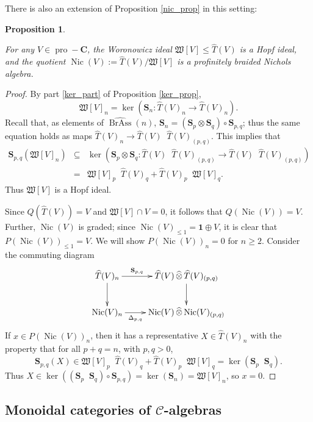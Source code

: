 \documentclass[12pt]{article}
\DeclareMathOperator{\Nic}{Nic}
\DeclareMathOperator{\pro}{pro}
\DeclareMathOperator{\BrAss}{BrAss}
\DeclareMathOperator{\hattimes}{\widehat{\otimes}}
\newcommand{\BrAsshat}{\widehat{\BrAss}} %
\newcommand{\That}{\widehat{T}}
\newcommand{\CC} {\mathcal{C}}
\newcommand{\bC} {\mathbf{C}}
\newcommand{\one} {\mathbf{1}}
\newcommand{\proC}{\pro\!-\bC}
\newcommand{\bS} {\mathbf{S}}
\newcommand{\mW}{\mathfrak{W}}
\theoremstyle{plain}
\newtheorem{prop}[thm]{Proposition}
\theoremstyle{definition}
\theoremstyle{remark}
\begin{document}
There is also an extension of Proposition \ref{nic_prop} in this setting:

\begin{prop} \label{infinite_nic_prop}

For any $V \in \proC$, the Woronowicz ideal $\mW[V] \leq \That(V)$ is a Hopf ideal, and the quotient $\Nic(V):= \That(V) / \mW[V]$ is a profinitely braided Nichols algebra.

\end{prop}

\begin{proof}

By part \ref{ker_part} of Proposition \ref{ker_prop}, 
%
$$\mW[V]_n = \ker(\bS_n: \That(V)_n \to \That(V)_n).$$
%
Recall that, as elements of $\BrAsshat(n)$, $\bS_n = (\bS_p \otimes \bS_q) \circ \bS_{p, q}$; thus the same equation holds as maps $\That(V)_n \to \That(V) \hattimes \That(V)_{(p, q)}$.  This implies that 
%
\begin{eqnarray*}
\bS_{p,q}(\mW[V]_n) & \subseteq & \ker(\bS_p \otimes \bS_q: \That(V) \hattimes \That(V)_{(p, q)} \to \That(V) \hattimes \That(V)_{(p, q)}) \\
 & = & \mW[V]_p \hattimes \That(V)_q + \That(V)_p \hattimes \mW[V]_q. 
 \end{eqnarray*} 
%
Thus $\mW[V]$ is a Hopf ideal.

Since $Q(\That(V)) = V$ and $\mW[V] \cap V = 0$, it follows that $Q(\Nic(V)) = V$.  Further, $\Nic(V)$ is graded; since $\Nic(V)_{\leq 1} = \one \oplus V$, it is clear that $P(\Nic(V))_{\leq 1} = V$.  We will show $P(\Nic(V))_{n} = 0$ for $n \geq 2$.  Consider the commuting diagram
%
$$\xymatrix{
\That(V)_n \ar[r]^-{\bS_{p, q}} \ar[d] & \That(V) \hattimes \That(V)_{(p, q)} \ar[d] \\
\Nic(V)_n \ar[r]_-{\Delta_{p, q}} & \Nic(V) \hattimes \Nic(V)_{(p, q)}
}$$
%
If $x \in P(\Nic(V))_{n}$, then it has a representative $X \in \That(V)_n$ with the property that for all $p+q = n$, with $p, q>0$, 
%
$$\bS_{p,q}(X) \in \mW[V]_p \hattimes \That(V)_q + \That(V)_p \hattimes \mW[V]_q = \ker(\bS_p \hattimes \bS_q).$$
%
Thus $X \in \ker((\bS_p \hattimes \bS_q) \circ \bS_{p, q}) = \ker(\bS_n) = \mW[V]_n$, so $x=0$.

\end{proof}



\subsection{Monoidal categories of $\CC$-algebras}
\end{document}
